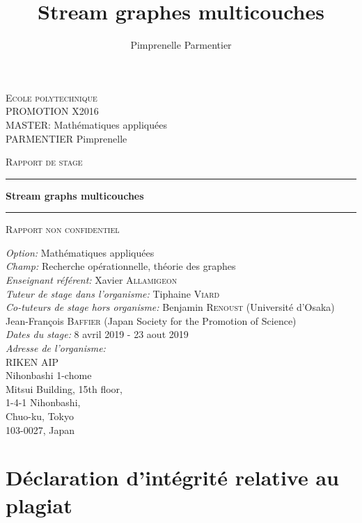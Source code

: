 \documentclass[11pt,a4paper]{article}
\author{Pimprenelle Parmentier}
\title{Stream graphes multicouches}
\theoremstyle{definition}
\theoremstyle{remark}
\theoremstyle{remark}
\def \Stgms {Stream graphs multicouches}
\begin{document}
\begin{titlepage}


\noindent
\textsc{Ecole polytechnique}\\
PROMOTION X2016 \\
MASTER: Mathématiques appliquées\\
PARMENTIER Pimprenelle

\vspace{3cm}
\begin{center}
\textsc{\Large Rapport de stage}
\vspace{1cm}
\hrule %
\vspace{0.4cm}
{\huge \bfseries \Stgms \par}\vspace{0.4cm} %
\hrule 
\vspace{1cm}
\textsc{\Large Rapport non confidentiel}
\vspace{4cm} %
 
\end{center}

\noindent
\textit{Option:} Mathématiques appliquées\\
\textit{Champ:} Recherche opérationnelle, théorie des graphes\\
\textit{Enseignant référent:} Xavier \textsc{Allamigeon}\\
\textit{Tuteur de stage dans l'organisme:} Tiphaine \textsc{Viard}\\
\textit {Co-tuteurs de stage hors organisme:} Benjamin \textsc{Renoust} (Université d'Osaka)\\
\hspace*{3.1cm} Jean-François \textsc{Baffier} (Japan Society for the Promotion of Science)\\
\textit{Dates du stage:} 8 avril 2019 - 23 aout 2019\\
\textit{Adresse de l'organisme:}\\
RIKEN AIP\\
Nihonbashi 1-chome \\
Mitsui Building, 15th floor,\\
1-4-1 Nihonbashi,\\
Chuo-ku, Tokyo\\
103-0027, Japan\\
\end{titlepage}

\section*{Déclaration d’intégrité relative au plagiat}
\end{document}
